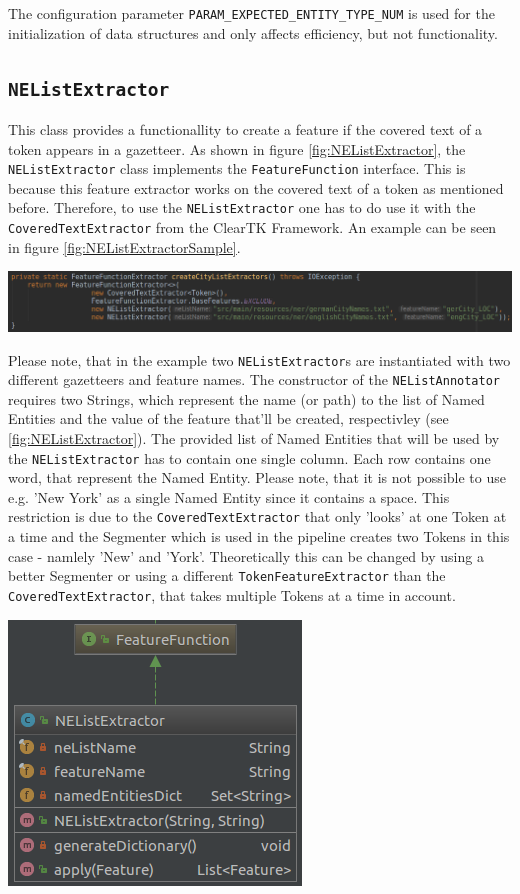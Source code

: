 \documentclass[11pt, english]{article}
\begin{document}
The configuration parameter \verb/PARAM_EXPECTED_ENTITY_TYPE_NUM/ is used for the initialization of data structures and only affects efficiency, but not functionality.

\subsection{\texttt{NEListExtractor}}
This class provides a functionallity to create a feature if the covered text of a token appears in a gazetteer. As shown in figure \ref{fig:NEListExtractor}, the \verb/NEListExtractor/ class implements the \verb/FeatureFunction/ interface. This is because this feature extractor works on the covered text of a token as mentioned before. Therefore, to use the \verb/NEListExtractor/ one has to do use it with the \verb/CoveredTextExtractor/ from the ClearTK Framework. An example can be seen in figure \ref{fig:NEListExtractorSample}.

\includegraphics[width=\linewidth, keepaspectratio]{gfx/createNEListExtractor.png}
\label{fig:NEListExtractorSample}

Please note, that in the example two \verb/NEListExtractor/s are instantiated with two different gazetteers and feature names. The constructor of the \verb/NEListAnnotator/ requires two Strings, which represent the name (or path) to the list of Named Entities and the value of the feature that'll be created, respectivley (see \ref{fig:NEListExtractor}). The provided list of Named Entities that will be used by the \verb/NEListExtractor/ has to contain one single column. Each row contains one word, that represent the Named Entity. Please note, that it is not possible to use e.g. 'New York' as a single Named Entity since it contains a space. This restriction is due to the \verb/CoveredTextExtractor/ that only 'looks' at one Token at a time and the Segmenter which is used in the pipeline creates two Tokens in this case - namlely 'New' and 'York'. Theoretically this can be changed by using a better Segmenter or using a different \verb/TokenFeatureExtractor/ than the \verb/CoveredTextExtractor/, that takes multiple Tokens at a time in account.

\includegraphics[scale=0.75]{gfx/NEListExtractor.png}
\label{fig:NEListExtractor}
\end{document}
